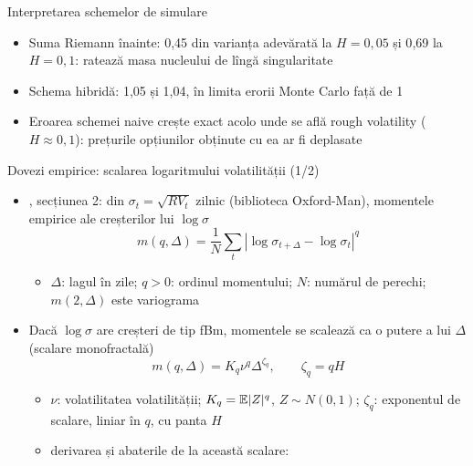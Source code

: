 \begin{frame}{Interpretarea schemelor de simulare}
\itemsize{\small}
\begin{itemize}
    \item Suma Riemann înainte: 0{,}45 din varianța adevărată la $H = 0{,}05$ și 0{,}69 la $H = 0{,}1$: ratează masa nucleului de lîngă singularitate
    \item Schema hibridă: 1{,}05 și 1{,}04, în limita erorii Monte Carlo față de 1
    \item Eroarea schemei naive crește exact acolo unde se află rough volatility ($H \approx 0{,}1$): prețurile opțiunilor obținute cu ea ar fi deplasate
\end{itemize}
\end{frame}

\begin{frame}{Dovezi empirice: scalarea logaritmului volatilității (1/2)}
\itemsize{\small}
\begin{itemize}
    \item {}, secțiunea 2: din $\sigma_t = \sqrt{RV_t}$ zilnic (biblioteca Oxford-Man), momentele empirice ale creșterilor lui $\log\sigma$
    \[ m(q, \Delta) = \frac1N\sum_t|\log\sigma_{t+\Delta} - \log\sigma_t|^q \]
    \begin{itemize}
        \item $\Delta$: lagul în zile; $q > 0$: ordinul momentului; $N$: numărul de perechi; $m(2, \Delta)$ este variograma
    \end{itemize}
    \item Dacă $\log\sigma$ are creșteri de tip fBm, momentele se scalează ca o putere a lui $\Delta$ (scalare monofractală)
    \[ m(q, \Delta) = K_q\nu^q\Delta^{\zeta_q}, \qquad \zeta_q = qH \]
    \begin{itemize}
        \item $\nu$: volatilitatea volatilității; $K_q = \mathbb{E}|Z|^q$, $Z \sim N(0, 1)$; $\zeta_q$: exponentul de scalare, liniar în $q$, cu panta $H$
        \item derivarea și abaterile de la această scalare:   %
    \end{itemize}
\end{itemize}
\end{frame}


